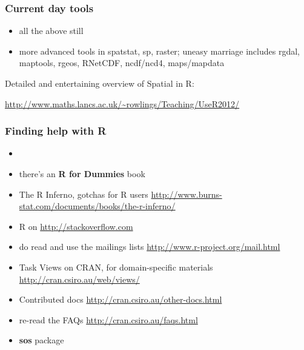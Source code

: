 \documentclass{beamer}\usepackage{graphicx, color}
\begin{document}
\begin{frame}
 \frametitle{Current day tools}
  \begin{itemize}
    \item all the above still
    \item more advanced tools in spatstat, sp, raster;  uneasy marriage includes rgdal, maptools, rgeos, RNetCDF, ncdf/ncd4, maps/mapdata
  \end{itemize}
  
 Detailed and entertaining overview of Spatial in R:
 
\url{http://www.maths.lancs.ac.uk/~rowlings/Teaching/UseR2012/}
 
 
\end{frame}



\begin{frame}[fragile]
  \frametitle{Finding help with R}

\begin{itemize}
 \item 
\item there's an \textbf{R for Dummies} book
\item The R Inferno, gotchas for R users \url{http://www.burns-stat.com/documents/books/the-r-inferno/}
 \item R on \url{http://stackoverflow.com}
 \item do read and use the mailings lists \url{http://www.r-project.org/mail.html}
 \item Task Views on CRAN, for domain-specific materials \url{http://cran.csiro.au/web/views/}
 \item Contributed docs \url{http://cran.csiro.au/other-docs.html}
 \item re-read the FAQs \url{http://cran.csiro.au/faqs.html}
\item \textbf{sos} package 
\end{itemize}
\end{frame}
 
\end{document}
